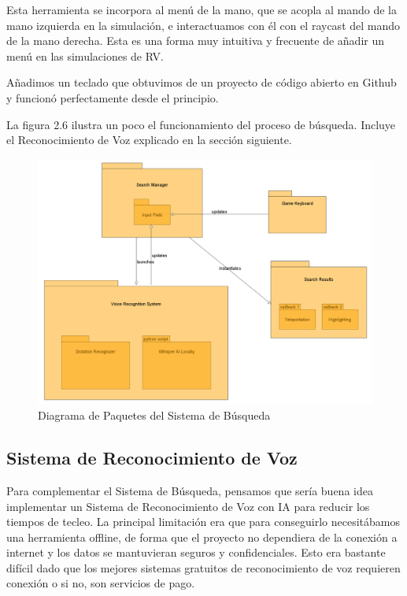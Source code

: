 Esta herramienta se incorpora al menú de la mano, que se acopla al mando de la mano izquierda en la simulación, e interactuamos con él con el raycast del mando de la mano derecha. Esta es una forma muy intuitiva y frecuente de añadir un menú en las simulaciones de RV.

Añadimos un teclado que obtuvimos de un proyecto de código abierto en Github y funcionó perfectamente desde el principio. \cite[]{Keyboard}

La figura 2.6 ilustra un poco el funcionamiento del proceso de búsqueda. Incluye el Reconocimiento de Voz explicado en la sección siguiente.

\begin{figure}[ht]
   \begin{center}
      \includegraphics[width=1\linewidth]{chapter2/figures/searchsystem.png}
   \end{center}
   \caption[Diagrama de Paquetes del Sistema de Búsqueda]
   {\footnotesize Diagrama de Paquetes del Sistema de Búsqueda}
   \label{fig:mufigure10}
\end{figure}

\subsection{Sistema de Reconocimiento de Voz}

Para complementar el Sistema de Búsqueda, pensamos que sería buena idea implementar un Sistema de Reconocimiento de Voz con IA para reducir los tiempos de tecleo. La principal limitación era que para conseguirlo necesitábamos una herramienta offline, de forma que el proyecto no dependiera de la conexión a internet y los datos se mantuvieran seguros y confidenciales.
Esto era bastante difícil dado que los mejores sistemas gratuitos de reconocimiento de voz requieren conexión o si no, son servicios de pago.

